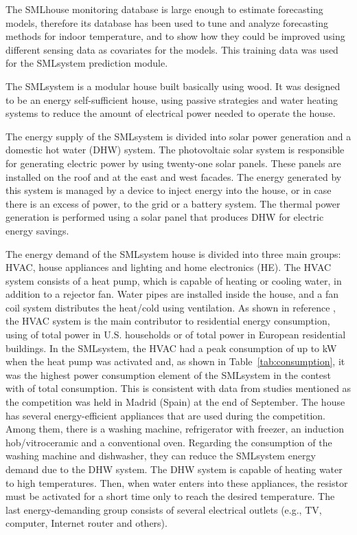 \documentclass[energies,article,accept,moreauthors,pdftex,12pt,a4paper]{mdpi}
\newcommand{\smlhouse}{SMLhouse\xspace}
\newcommand{\smlsystem}{SMLsystem\xspace}
\begin{document}
The \smlhouse monitoring database is large enough to estimate forecasting models, therefore its database has been used to tune and analyze forecasting methods for
indoor temperature, and to show how they could be improved using different sensing data as
covariates for the models. This training data was used for the \smlsystem prediction
module.

The \smlsystem is a modular house built basically using wood. It was designed to
be an energy self-sufficient house, using passive strategies and water heating
systems to reduce the amount of electrical power needed to operate the house.

The energy supply of the \smlsystem is divided into solar power generation
and a domestic hot water (DHW) system. The photovoltaic solar system is responsible
for generating electric power by using twenty-one solar panels.
These panels are installed on the roof and at the east and west facades.
\linebreak The energy generated by this system is managed by a device to inject energy into the house,
or in case there is an excess of power, to the grid or a battery system.
The thermal power generation is performed using a solar panel that produces
DHW for electric energy savings.

The energy demand of the \smlsystem house is divided into three main groups: HVAC,
house appliances and lighting and home electronics (HE). The HVAC
system consists of a heat pump, \linebreak which is capable of heating or cooling water, in addition to a
rejector fan. Water pipes are installed inside the house, and a fan coil system distributes
the heat/cold using ventilation.
As shown in reference \cite{eebuildings}, \linebreak the HVAC system is the main contributor to
residential energy consumption, using  of total power in U.S. households or  of total power in European residential buildings.
In the \smlsystem,  \linebreak the HVAC had a peak consumption of up to  kW
when the heat pump was activated and, as shown in Table~\ref{tab:consumption},
it was the highest power consumption element of the \smlsystem in the contest
with  of total consumption. This is consistent with data from studies mentioned
 as the competition was held in Madrid (Spain) at the end of September.
The house has several energy-efficient appliances that are
used during the competition. Among them, there is a washing machine,
refrigerator with freezer, an induction hob/vitroceramic and a conventional oven.
Regarding the consumption of the washing machine and dishwasher,
they can reduce the \smlsystem energy demand due to the DHW system.
\linebreak The DHW system is capable of heating water to high temperatures. Then, when water
enters into these appliances, the resistor must be activated for a short time only to reach
the desired temperature. \linebreak The last energy-demanding group consists of several electrical outlets
(e.g., TV, computer, Internet router and others).
\end{document}
